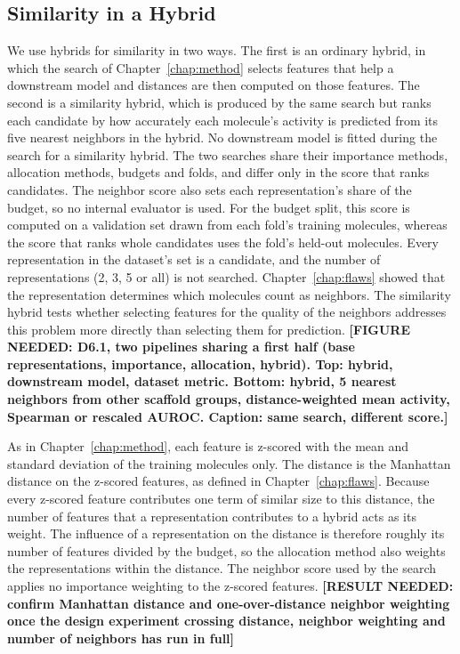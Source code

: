 \subsection{Similarity in a Hybrid}

We use hybrids for similarity in two ways. The first is an ordinary hybrid, in which the search of Chapter~\ref{chap:method} selects features that help a downstream model and distances are then computed on those features. The second is a similarity hybrid, which is produced by the same search but ranks each candidate by how accurately each molecule's activity is predicted from its five nearest neighbors in the hybrid. No downstream model is fitted during the search for a similarity hybrid. The two searches share their importance methods, allocation methods, budgets and folds, and differ only in the score that ranks candidates. The neighbor score also sets each representation's share of the budget, so no internal evaluator is used. For the budget split, this score is computed on a validation set drawn from each fold's training molecules, whereas the score that ranks whole candidates uses the fold's held-out molecules. Every representation in the dataset's set is a candidate, and the number of representations (2, 3, 5 or all) is not searched. Chapter~\ref{chap:flaws} showed that the representation determines which molecules count as neighbors. The similarity hybrid tests whether selecting features for the quality of the neighbors addresses this problem more directly than selecting them for prediction. \textbf{[FIGURE NEEDED: D6.1, two pipelines sharing a first half (base representations, importance, allocation, hybrid). Top: hybrid, downstream model, dataset metric. Bottom: hybrid, 5 nearest neighbors from other scaffold groups, distance-weighted mean activity, Spearman or rescaled AUROC. Caption: same search, different score.]}

As in Chapter~\ref{chap:method}, each feature is z-scored with the mean and standard deviation of the training molecules only. The distance is the Manhattan distance on the z-scored features, as defined in Chapter~\ref{chap:flaws}. Because every z-scored feature contributes one term of similar size to this distance, the number of features that a representation contributes to a hybrid acts as its weight. The influence of a representation on the distance is therefore roughly its number of features divided by the budget, so the allocation method also weights the representations within the distance. The neighbor score used by the search applies no importance weighting to the z-scored features. \textbf{[RESULT NEEDED: confirm Manhattan distance and one-over-distance neighbor weighting once the design experiment crossing distance, neighbor weighting and number of neighbors has run in full]}

